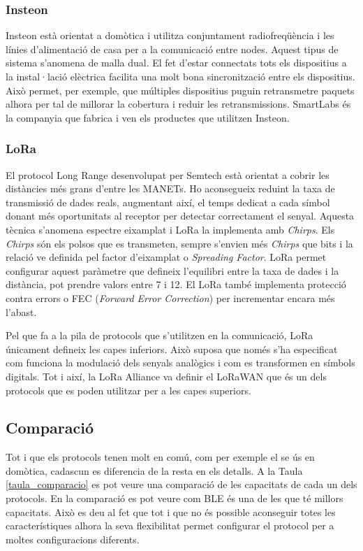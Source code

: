\subsubsection{Insteon}
Insteon està orientat a domòtica i utilitza conjuntament radiofreqüència i les línies d'alimentació de casa per a la comunicació entre nodes.
Aquest tipus de sistema s'anomena de malla dual.
El fet d'estar connectats tots els dispositius a la instal·lació elèctrica facilita una molt bona sincronització entre els dispositius.
Això permet, per exemple, que múltiples dispositius puguin retransmetre paquets alhora per tal de millorar la cobertura i reduir les retransmissions.
SmartLabs és la companyia que fabrica i ven els productes que utilitzen Insteon.

\subsubsection{LoRa}
El protocol Long Range desenvolupat per Semtech està orientat a cobrir les distàncies més grans d'entre les MANETs.
Ho aconsegueix reduint la taxa de transmissió de dades reals, augmentant així, el temps dedicat a cada símbol donant més oportunitats al receptor per detectar correctament el senyal.
Aquesta tècnica s'anomena espectre eixamplat i LoRa la implementa amb \textit{Chirps}.
Els \textit{Chirps} són els polsos que es transmeten, sempre s'envien més \textit{Chirps} que bits i la relació ve definida pel factor d'eixamplat o \textit{Spreading Factor}.
LoRa permet configurar aquest paràmetre que defineix l'equilibri entre la taxa de dades i la distància, pot prendre valors entre 7 i 12.
El LoRa també implementa protecció contra errors o FEC (\textit{Forward Error Correction}) per incrementar encara més l'abast.

Pel que fa a la pila de protocols que s'utilitzen en la comunicació, LoRa únicament defineix les capes inferiors.
Això suposa que només s'ha especificat com funciona la modulació dels senyals analògics i com es transformen en símbols digitals.
Tot i així, la LoRa Alliance va definir el LoRaWAN que és un dels protocols que es poden utilitzar per a les capes superiors.


\subsection{Comparació}
Tot i que els protocols tenen molt en comú, com per exemple el se ús en domòtica, cadascun es diferencia de la resta en els detalls.
A la Taula \ref{taula_comparacio} es pot veure una comparació de les capacitats de cada un dels protocols.
En la comparació es pot veure com BLE és una de les que té millors capacitats.
Això es deu al fet que tot i que no és possible aconseguir totes les característiques alhora la seva flexibilitat permet configurar el protocol per a moltes configuracions diferents.


